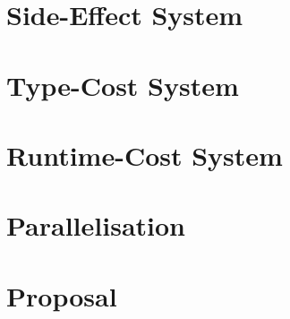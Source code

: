 \documentclass[12pt,a4paper,twoside,openright]{report}
\begin{document}


\newpage

\chapter{Side-Effect System}



\newpage

\chapter{Type-Cost System}



\newpage

\chapter{Runtime-Cost System}



\newpage

\chapter{Parallelisation}



\newpage

\chapter{Proposal}




\end{document}
